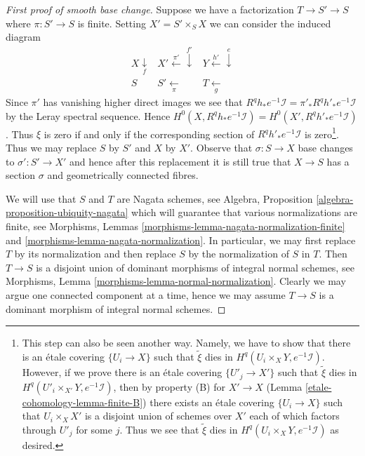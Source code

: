 \begin{proof}[First proof of smooth base change]
\medskip\noindent
Suppose we have a factorization $T \to S' \to S$ where
$\pi : S' \to S$ is finite.
Setting $X' = S' \times_S X$ we can consider the induced diagram
$$
\begin{array}{ccc}X \underset{f}{\downarrow} & X' \overset{\pi'}{\longleftarrow}\overset{f'}{\downarrow} & Y \overset{h'}{\longleftarrow}\overset{e}{\downarrow} \\ S & S' \underset{\pi}{\longleftarrow} & T \underset{g}{\longleftarrow}\end{array}
$$
Since $\pi'$ has vanishing higher direct images we see that
$R^qh_*e^{-1}\mathcal{I} = \pi'_*R^qh'_*e^{-1}\mathcal{I}$
by the Leray spectral sequence. Hence
$H^0(X, R^qh_*e^{-1}\mathcal{I}) = H^0(X', R^qh'_*e^{-1}\mathcal{I})$.
Thus $\xi$ is zero if and only if the corresponding section of
$R^qh'_*e^{-1}\mathcal{I}$ is zero\footnote{This
step can also be seen another way. Namely, we have to show that
there is an \'etale covering $\{U_i \to X\}$ such that
$\tilde \xi$ dies in $H^q(U_i \times_X Y, e^{-1}\mathcal{I})$.
However, if we prove there is an \'etale covering
$\{U'_j \to X'\}$ such that $\tilde \xi$ dies in
$H^q(U'_i \times_{X'} Y, e^{-1}\mathcal{I})$, then by property (B)
for $X' \to X$ (Lemma \ref{etale-cohomology-lemma-finite-B}) there exists an \'etale covering
$\{U_i \to X\}$ such that $U_i \times_X X'$ is a disjoint union
of schemes over $X'$ each of which factors through $U'_j$ for some $j$.
Thus we see that $\tilde \xi$ dies in $H^q(U_i \times_X Y, e^{-1}\mathcal{I})$
as desired.}.
Thus we may replace $S$ by $S'$ and $X$ by $X'$.
Observe that $\sigma : S \to X$ base changes to $\sigma' : S' \to X'$
and hence after this replacement it is still true that $X \to S$
has a section $\sigma$ and geometrically connected fibres.

\medskip\noindent
We will use that $S$ and $T$ are Nagata schemes, see
Algebra, Proposition \ref{algebra-proposition-ubiquity-nagata}
which will guarantee
that various normalizations are finite, see
Morphisms, Lemmas \ref{morphisms-lemma-nagata-normalization-finite} and
\ref{morphisms-lemma-nagata-normalization}.
In particular, we may first replace $T$ by its normalization
and then replace $S$ by the normalization of $S$ in $T$.
Then $T \to S$ is a disjoint union of dominant
morphisms of integral normal schemes, see
Morphisms, Lemma \ref{morphisms-lemma-normal-normalization}.
Clearly we may argue one connected component
at a time, hence we may assume $T \to S$ is a
dominant morphism of integral normal schemes.


\end{proof}

